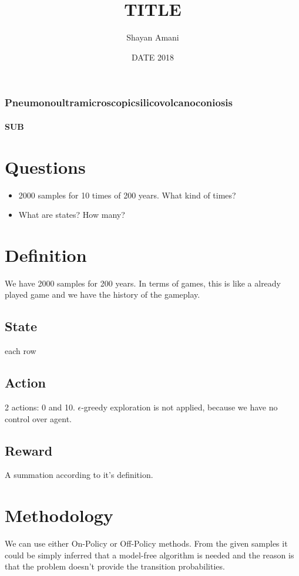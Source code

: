 \documentclass{beamer}
\title{TITLE}
\author{Shayan Amani}
\date{DATE 2018}
\institute{Department of Computer Science, University of New Hampshire}
\begin{document}
  \begin{frame}
    \titlepage
  \end{frame}

  \begin{frame}
    \frametitle{Pneumonoultramicroscopicsilicovolcanoconiosis}
    \framesubtitle{SUB}

  \end{frame}


    \section{Questions}
\begin{itemize}
    \item 2000 samples for 10 times of 200 years. What kind of times?
    \item What are states? How many?
\end{itemize}

\section{Definition}
We have 2000 samples for 200 years. In terms of games, this is like a already played game and we have the history of the gameplay.

\subsection{State}
each row

\subsection{Action}
2 actions: 0 and 10.
$\epsilon$-greedy exploration is not applied, because we have no control over agent.

\subsection{Reward}
A summation according to it's definition.


\section{Methodology}
We can use either On-Policy or Off-Policy methods. From the given samples it could be simply inferred that a model-free algorithm is needed and the reason is that the problem doesn't provide the transition probabilities.


\end{document}
